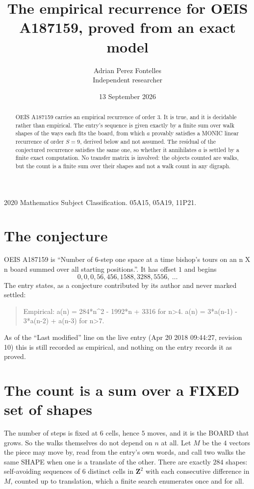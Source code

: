\documentclass[11pt,a4paper]{article}
\title{The empirical recurrence for OEIS A187159, proved from an exact model}
\author{Adrian Perez Fontelles\\ \small Independent researcher}
\date{13 September 2026}
\theoremstyle{plain}
\theoremstyle{definition}
\begin{document}
\maketitle

\begin{abstract}
OEIS A187159 carries an empirical recurrence of order $3$. It is true, and it is
decidable rather than empirical. The entry's sequence is given exactly by a finite sum over walk shapes of the ways each fits the board, from
which $a$ provably satisfies a MONIC linear recurrence of order $S=9$, derived below and not
assumed. The residual of the conjectured recurrence satisfies the same one, so whether it
annihilates $a$ is settled by a finite exact computation. No transfer matrix is involved: the objects counted are walks, but the count is a finite sum over their shapes and not a walk count in any digraph.
\end{abstract}

\noindent\small 2020 Mathematics Subject Classification. 05A15, 05A19, 11P21.\normalsize

\section{The conjecture}

OEIS A187159 is ``Number of 6-step one space at a time bishop's tours on an n X n board summed over all starting positions.''. It has offset $1$ and begins
\[
0, 0, 0, 56, 456, 1588, 3288, 5556,\ \dots
\]
The entry states, as a conjecture contributed by its author and never marked settled:
\begin{quote}
Empirical: a(n) = 284*n\^{}2 - 1992*n + 3316 for n>4. a(n) = 3*a(n-1) - 3*a(n-2) + a(n-3) for n>7.
\end{quote}
As of the ``Last modified'' line on the live entry (Apr 20 2018 09:44:27, revision 10)
this is still recorded as empirical, and nothing on the entry records it as proved.

\section{The count is a sum over a FIXED set of shapes}

The number of steps is fixed at $6$ cells, hence $5$ moves, and it is the BOARD
that grows. So the walks themselves do not depend on $n$ at all. Let $M$ be the $4$
vectors the piece may move by, read from the entry's own words, and call two walks the same
SHAPE when one is a translate of the other. There are exactly $284$ shapes: self-avoiding
sequences of $6$ distinct cells in $\mathbf{Z}^{2}$ with each consecutive difference in
$M$, counted up to translation, which a finite search enumerates once and for all.
\end{document}
